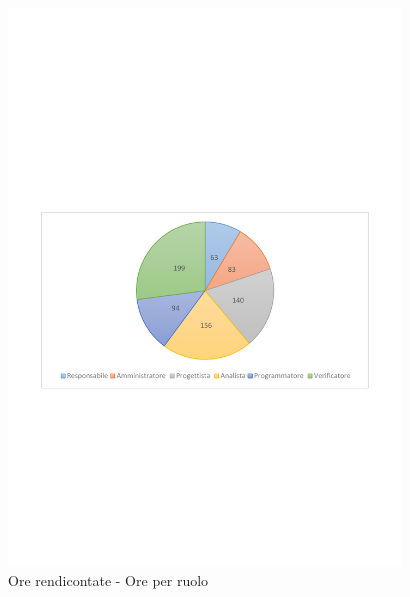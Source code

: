 \documentclass[../PianoProgetto.tex]{subfiles}
\begin{document}
	\begin{figure}[!h]
		\centering
		\includegraphics[width=0.93\textwidth , trim=2cm 9.5cm 2cm 11cm]{grafici/Riepilogo/Rendicontate/ore-ruolo}
			\caption{Ore rendicontate - Ore per ruolo}
		\label{fig:CircleChart-rendicontate_ore_r}
	\end{figure}
\vfill	
\end{document}
